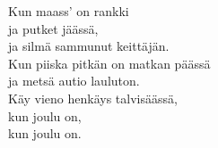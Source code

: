 
Kun maass' on rankki \\ ja putket jäässä, \\ ja silmä sammunut keittäjän. \\ Kun piiska pitkän on matkan päässä \\ ja metsä autio lauluton. \\ Käy vieno henkäys talvisäässä, \\ kun joulu on, \\ kun joulu on.